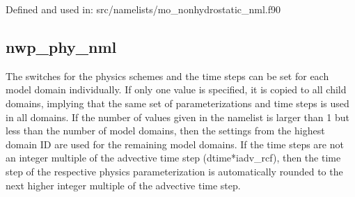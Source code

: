 Defined and used in: src/namelists/mo\_nonhydrostatic\_nml.f90


\subsection{nwp\_phy\_nml}

The switches for the physics schemes and the time steps can be set for each model domain individually.
If only one value is specified, it is copied to all child domains, implying that the same set
of parameterizations and time steps is used in all domains. If the number of values given
in the namelist is larger than 1 but less than the number of model domains, then the settings
from the highest domain ID are used for the remaining model domains. If the time steps are not
an integer multiple of the advective time step (dtime*iadv\_rcf), then the time step of the
respective physics parameterization is automatically rounded to the next higher integer multiple
of the advective time step.


